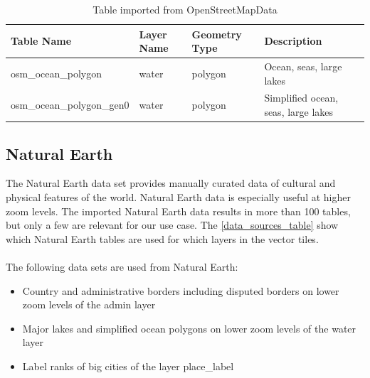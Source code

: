 \begin{table}[H]
\centering
    \begin{tabular}{llll}
    \hline
    Table Name            & Layer Name & Geometry Type & Description \\
    \hline
    osm\_ocean\_polygon        & water & polygon       & Ocean, seas, large lakes           \\
    osm\_ocean\_polygon\_gen0        & water & polygon       & Simplified ocean, seas, large lakes           \\
    \end{tabular}
    \caption{Table imported from OpenStreetMapData}
\end{table}

\newpage
\subsection{Natural Earth}

The Natural Earth \cite{16_naturalearthdata.com_2015} data set provides manually curated data of cultural and physical features of the world. Natural Earth data is especially useful at higher zoom levels. The imported Natural Earth data results in more than 100 tables, but only a few
are relevant for our use case. The \autoref{data_sources_table} show which Natural Earth tables are used for which layers in the vector tiles.\\\\
The following data sets are used from Natural Earth:

\begin{itemize}
\item Country and administrative borders including disputed borders on lower zoom levels of the admin layer
\item Major lakes and simplified ocean polygons on lower zoom levels of the water layer
\item Label ranks of big cities of the layer place\_label
\end{itemize}

